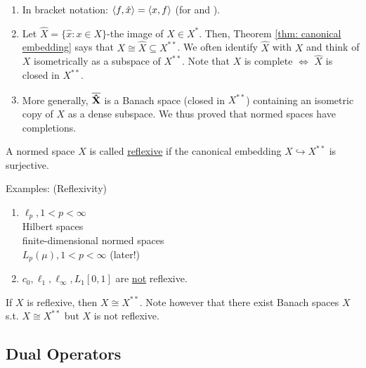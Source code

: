 \documentclass{article}
\begin{document}
\begin{remark}
    \begin{enumerate}
        \item In bracket notation: $\langle f, \hat{x}\rangle=\langle x, f\rangle$ (for  and ).
        \item Let $\hat{X} = \{\hat{x}:x\in X\}$-the image of $X\in X^*$. Then, Theorem \ref{thm: canonical embedding} says that $X\cong \hat{X}\subseteq X^{**}$. We often identify $\hat{X}$ with $X$ and think of $X$ isometrically as a subspace of $X^{**}$. Note that $X$ is complete $\iff$ $\hat{X}$ is closed in $X^{**}$.
        \item More generally, $\mathbf{\overline{\hat{X}}}$ is a Banach space (closed in $X^{**}$) containing an isometric copy of $X$ as a dense subspace. We thus proved that normed spaces have completions.
    \end{enumerate}
\end{remark}

\begin{boxdef}[Reflexivity]\label{def: reflexive}
    A normed space $X$ is called \noindent\underline{reflexive} if the canonical embedding $X\hookrightarrow X^{**}$ is surjective.
\end{boxdef}


\begin{examplesblock}{Examples: (Reflexivity) }\label{examples: 2} 
    \begin{enumerate}
    \item 
        $\ell_p, 1<p<\infty$\\
        Hilbert spaces\\
        finite-dimensional normed spaces\\
        $L_p(\mu), 1<p<\infty$  (later!)
    \item $c_0, \ell_1, \ell_\infty, L_1[0,1]$ are \noindent\underline{not} reflexive.
\end{enumerate}
\end{examplesblock}

\begin{remark}
    If $X$ is reflexive, then $X\cong X^{**}$. Note however that there exist Banach spaces $X$ s.t. $X\cong X^{**}$ but $X$ is not reflexive.
\end{remark}


\subsection{Dual Operators}
\end{document}
